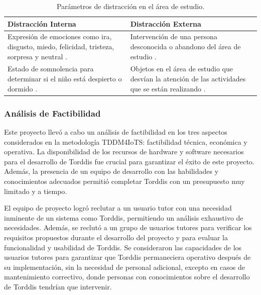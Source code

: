 \documentclass[a4paper,fleqn]{cas-sc}
\begin{document}
		\begin{table}[H]
			\centering
			\caption{Parámetros de distracción en el área de estudio. \label{tab:DistractionParameters}}
			\begin{tabular}{p{0.46\textwidth}p{}}
				\hline
				\multicolumn{1}{l}{\rule{0pt}{2.5ex}\textbf{Distracción Interna}} & \multicolumn{1}{l}{\rule{0pt}{2.5ex}\textbf{Distracción Externa}} \\ \hline
				Expresión de emociones como ira, disgusto, miedo, felicidad, tristeza, sorpresa y neutral \citep{Asish2022Detecting,Vettivel2018System,Pabba2022AnIntelligent}. & Intervención de una persona desconocida o abandono del área de estudio \citep{Vettivel2018System}. \\ \hline
				Estado de somnolencia para determinar si el niño está despierto o dormido \citep{Pabba2022AnIntelligent}. & Objetos en el área de estudio que desvían la atención de las actividades que se están realizando \citep{Asish2022Detecting,Pabba2022AnIntelligent}. \\ \hline
			\end{tabular}
		\end{table}
		
		\subsubsection{Análisis de Factibilidad}
		Este proyecto llevó a cabo un análisis de factibilidad en los tres aspectos considerados en la metodología TDDM4IoTS: factibilidad técnica, económica y operativa. La disponibilidad de los recursos de hardware y software necesarios para el desarrollo de Torddis fue crucial para garantizar el éxito de este proyecto. Además, la presencia de un equipo de desarrollo con las habilidades y conocimientos adecuados permitió completar Torddis con un presupuesto muy limitado y a tiempo.
		
		El equipo de proyecto logró reclutar a un usuario tutor con una necesidad inminente de un sistema como Torddis, permitiendo un análisis exhaustivo de necesidades. Además, se reclutó a un grupo de usuarios tutores para verificar los requisitos propuestos durante el desarrollo del proyecto y para evaluar la funcionalidad y usabilidad de Torddis. Se consideraron las capacidades de los usuarios tutores para garantizar que Torddis permaneciera operativo después de su implementación, sin la necesidad de personal adicional, excepto en casos de mantenimiento correctivo, donde personas con conocimientos sobre el desarrollo de Torddis tendrían que intervenir.
		
\end{document}

